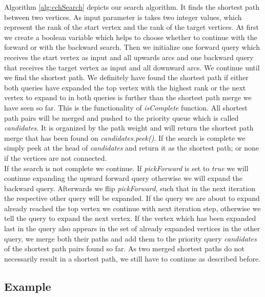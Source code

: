 Algorithm \ref{alg:cchSearch} depicts our search algorithm.
It finds the shortest path between two vertices.
As input parameter is takes two integer values, which represent the rank of the start vertex and the rank of the target vertices.
At first we create a boolean variable which helps to choose whether to continue with the forward or with the backward search.
Then we initialize one forward query which receives the start vertex as input and all upwards arcs and one backward query that receives the target vertex as input and all downward arcs.
We continue until we find the shortest path.
We definitely have found the shortest path if either both queries have expanded the top vertex with the highest rank or the next vertex to expand to in both queries is further than the shortest path merge we have seen so far.
This is the functionality of \textit{isComplete} function.
All shortest path pairs will be merged and pushed to the priority queue which is called \textit{candidates}.
It is organized by the path weight and will return the shortest path merge that has been found on \textit{candidates.peek()}.
If the search is complete we simply peek at the head of \textit{candidates} and return it as the shortest path; or none if the vertices are not connected.
\\
If the search is not complete we continue.
If \textit{pickForward} is set to \textit{true} we will continue expanding the upward forward query otherwise we will expand the backward query.
Afterwards we flip \textit{pickForward}, such that in the next iteration the respective other query will be expanded.
If the query we are about to expand already reached the top vertex we continue with next iteration step, otherwise we tell the query to expand the next vertex.
If the vertex which has been expanded last in the query also appears in the set of already expanded vertices in the other query, we merge both their paths and add them to the priority query \textit{candidates} of the shortest path pairs found so far.
As two merged shortest paths do not necessarily result in a shortest path, we still have to continue as described before.

\subsection{Example}

